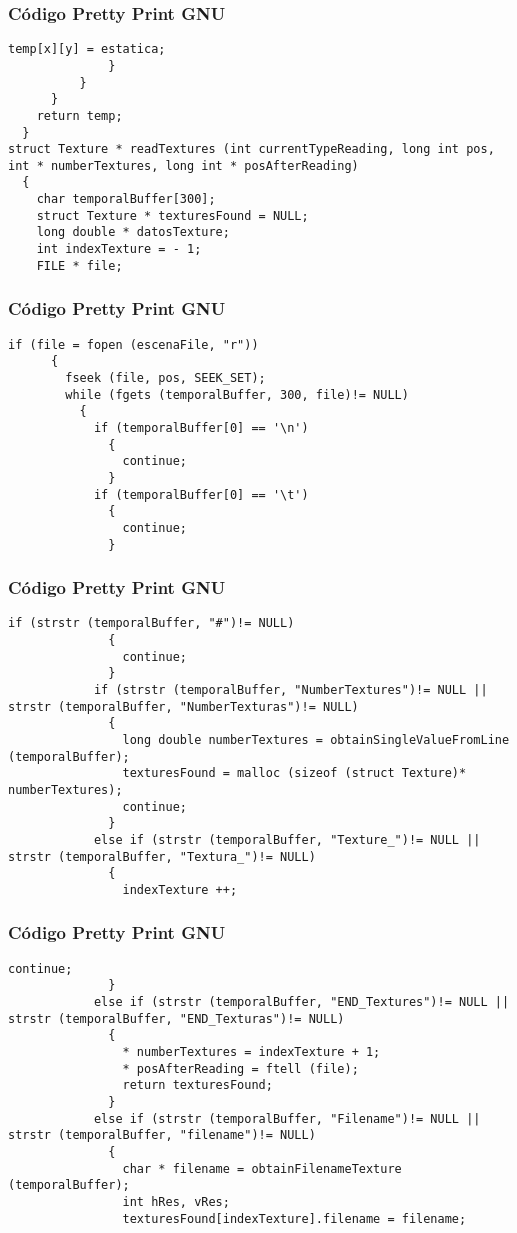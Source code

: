\documentclass{beamer}
\begin{document}
\begin{frame}[fragile]
\frametitle{C\'odigo Pretty Print GNU}
\begin{lstlisting}[style=CStyle]
                temp[x][y] = estatica;
              }
          }
      }
    return temp;
  }
struct Texture * readTextures (int currentTypeReading, long int pos, int * numberTextures, long int * posAfterReading)
  {
    char temporalBuffer[300];
    struct Texture * texturesFound = NULL;
    long double * datosTexture;
    int indexTexture = - 1;
    FILE * file;
\end{lstlisting}
\end{frame}
\begin{frame}[fragile]
\frametitle{C\'odigo Pretty Print GNU}
\begin{lstlisting}[style=CStyle]
    if (file = fopen (escenaFile, "r"))
      {
        fseek (file, pos, SEEK_SET);
        while (fgets (temporalBuffer, 300, file)!= NULL)
          {
            if (temporalBuffer[0] == '\n')
              {
                continue;
              }
            if (temporalBuffer[0] == '\t')
              {
                continue;
              }
\end{lstlisting}
\end{frame}
\begin{frame}[fragile]
\frametitle{C\'odigo Pretty Print GNU}
\begin{lstlisting}[style=CStyle]
            if (strstr (temporalBuffer, "#")!= NULL)
              {
                continue;
              }
            if (strstr (temporalBuffer, "NumberTextures")!= NULL || strstr (temporalBuffer, "NumberTexturas")!= NULL)
              {
                long double numberTextures = obtainSingleValueFromLine (temporalBuffer);
                texturesFound = malloc (sizeof (struct Texture)* numberTextures);
                continue;
              }
            else if (strstr (temporalBuffer, "Texture_")!= NULL || strstr (temporalBuffer, "Textura_")!= NULL)
              {
                indexTexture ++;
\end{lstlisting}
\end{frame}
\begin{frame}[fragile]
\frametitle{C\'odigo Pretty Print GNU}
\begin{lstlisting}[style=CStyle]
                continue;
              }
            else if (strstr (temporalBuffer, "END_Textures")!= NULL || strstr (temporalBuffer, "END_Texturas")!= NULL)
              {
                * numberTextures = indexTexture + 1;
                * posAfterReading = ftell (file);
                return texturesFound;
              }
            else if (strstr (temporalBuffer, "Filename")!= NULL || strstr (temporalBuffer, "filename")!= NULL)
              {
                char * filename = obtainFilenameTexture (temporalBuffer);
                int hRes, vRes;
                texturesFound[indexTexture].filename = filename;
\end{lstlisting}
\end{frame}
\end{document}

